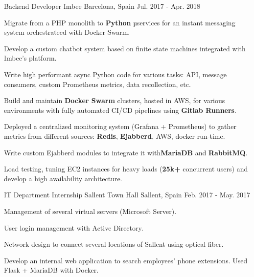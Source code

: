 \begin{cventries}
  \cventry
    {Backend Developer} %
    {Imbee} %
    {Barcelona, Spain} %
    {Jul. 2017 - Apr. 2018} %
    {
      \begin{cvitems} %
        \item {Migrate from a PHP monolith to \textbf{Python} µservices for an instant messaging system orchestrateed with Docker Swarm.}
        \item {Develop a custom chatbot system based on finite state machines integrated with Imbee's platform.}
        \item {Write high performant async Python code for various tasks: API, message consumers, custom Prometheus metrics, data recollection, etc.}
        \item {Build and maintain \textbf{Docker Swarm} clusters, hosted in AWS, for various environments with fully automated CI/CD pipelines using \textbf{Gitlab Runners}.}
        \item {Deployed a centralized monitoring system (Grafana + Prometheus) to gather metrics from different sources: \textbf{Redis}, \textbf{Ejabberd}, AWS, docker run-time.}
        \item {Write custom Ejabberd modules to integrate it with\textbf{MariaDB} and \textbf{RabbitMQ}.}
        \item {Load testing, tuning EC2 instances for heavy loads (\textbf{25k+} concurrent users) and develop a high availability architecture.}
      \end{cvitems}
    }

  \cventry
    {IT Department Internship} %
    {Sallent Town Hall} %
    {Sallent, Spain} %
    {Feb. 2017 - May. 2017} %
    {
      \begin{cvitems} %
        \item {Management of several virtual servers (Microsoft Server).}
        \item {User login management with Active Directory.}
        \item {Network design to connect several locations of Sallent using optical fiber.}
        \item {Develop an internal web application to search employees' phone extensions. Used Flask + MariaDB with Docker.}
      \end{cvitems}
    }

\end{cventries}
